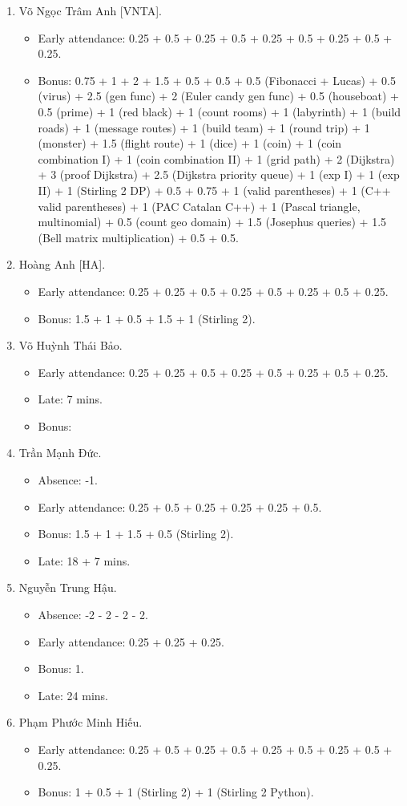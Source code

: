 \documentclass{article}
\begin{document}
\begin{enumerate}
	\item {\sc Võ Ngọc Trâm Anh [VNTA].}
	\begin{itemize}
		\item Early attendance: 0.25 + 0.5 + 0.25 + 0.5 + 0.25 + 0.5 + 0.25 + 0.5 + 0.25.
		\item Bonus: 0.75 + 1 + 2 + 1.5 + 0.5 + 0.5 + 0.5 (Fibonacci + Lucas) + 0.5 (virus) + 2.5 (gen func) + 2 (Euler candy gen func) + 0.5 (houseboat) + 0.5 (prime) + 1 (red black) + 1 (count rooms) + 1 (labyrinth) + 1 (build roads) + 1 (message routes) + 1 (build team) + 1 (round trip) + 1 (monster) + 1.5 (flight route) + 1 (dice) + 1 (coin) + 1 (coin combination I) + 1 (coin combination II) + 1 (grid path) + 2 (Dijkstra) + 3 (proof Dijkstra) + 2.5 (Dijkstra priority queue) + 1 (exp I) + 1 (exp II) + 1 (Stirling 2 DP) + 0.5 + 0.75 + 1 (valid parentheses) + 1 (C++ valid parentheses) + 1 (PAC Catalan C++) + 1 (Pascal triangle, multinomial) + 0.5 (count geo domain) + 1.5 (Josephus queries) + 1.5 (Bell matrix multiplication) + 0.5 + 0.5.
	\end{itemize}
	\item {\sc Hoàng Anh [HA].}
	\begin{itemize}
		\item Early attendance: 0.25 + 0.25 + 0.5 + 0.25 + 0.5 + 0.25 + 0.5 + 0.25.
		\item Bonus: 1.5 + 1 + 0.5 + 1.5 + 1 (Stirling 2).
	\end{itemize}
	\item {\sc Võ Huỳnh Thái Bảo.}
	\begin{itemize}
		\item Early attendance: 0.25 + 0.25 + 0.5 + 0.25 + 0.5 + 0.25 + 0.5 + 0.25.
		\item Late: 7 mins.
		\item Bonus: 
	\end{itemize}
	\item {\sc Trần Mạnh Đức.}
	\begin{itemize}
		\item Absence: -1.
		\item Early attendance: 0.25 + 0.5 + 0.25 + 0.25 + 0.25 + 0.5.
		\item Bonus: 1.5 + 1 + 1.5 + 0.5 (Stirling 2).
		\item Late: 18 + 7 mins.
	\end{itemize}
	\item {\sc Nguyễn Trung Hậu.}
	\begin{itemize}
		\item Absence: -2 - 2 - 2 - 2.
		\item Early attendance: 0.25 + 0.25 + 0.25.
		\item Bonus: 1.
		\item Late: 24 mins.
	\end{itemize}
	\item {\sc Phạm Phước Minh Hiếu.}
	\begin{itemize}
		\item Early attendance: 0.25 + 0.5 + 0.25 + 0.5 + 0.25 + 0.5 + 0.25 + 0.5 + 0.25.
		\item Bonus: 1 + 0.5 + 1 (Stirling 2) + 1 (Stirling 2 Python).		
		

\end{itemize}
\end{enumerate}
\end{document}
